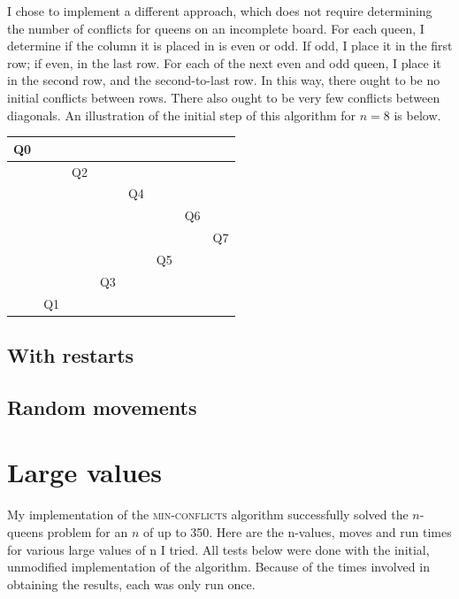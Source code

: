 \documentclass{article}
\begin{document}
\begin{doublespace}
I chose to implement a different approach, which does not require determining the number of conflicts for queens on an incomplete board. For each queen, I determine if the column it is placed in is even or odd. If odd, I place it in the first row; if even, in the last row. For each of the next even and odd queen, I place it in the second row, and the second-to-last row. In this way, there ought to be no initial conflicts between rows. There also ought to be very few conflicts between diagonals. An illustration of the initial step of this algorithm for $n = 8$ is below.\\

\begin{center}
\begin{tabular}{|c|c|c|c|c|c|c|c|}
\hline
Q0&  &  &  &  &  &  &  \\ \hline
  &  &Q2&  &  &  &  &  \\ \hline
  &  &  &  &Q4&  &  &  \\ \hline
  &  &  &  &  &  &Q6&  \\ \hline    
  &  &  &  &  &  &  &Q7\\ \hline
  &  &  &  &  &Q5&  &  \\ \hline
  &  &  &Q3&  &  &  &  \\ \hline
  &Q1&  &  &  &  &  &  \\ \hline        
\end{tabular}
\end{center}


\subsection{With restarts}

\subsection{Random movements}

\section{Large values}
My implementation of the \textsc{min-conflicts} algorithm successfully solved the $n$-queens problem for an $n$ of up to 350. Here are the n-values, moves and run times for various large values of n I tried. All tests below were done with the initial, unmodified implementation of the algorithm. Because of the times involved in obtaining the results, each was only run once.


\end{doublespace}
\end{document}

